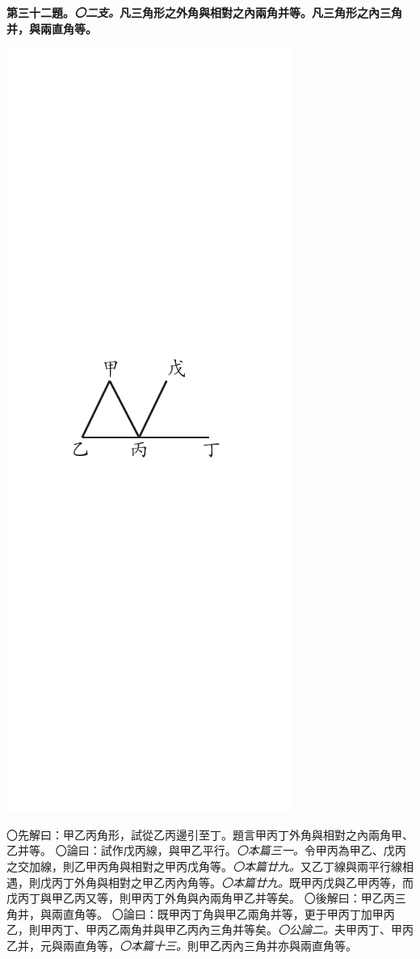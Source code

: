 \documentclass[12pt,b5paper,landscape]{article}
\newcommand{\ccom}[1]{{\footnotesize \emph{〇#1}}}
\newcommand{\bcom}[1]{〇#1}
\newcommand{\cthm}[1]{{
\vspace{8pt}

\bfseries #1}}
\begin{document}
\begin{multicols}{2}
\cthm{第三十二題。\ccom{二支。}凡三角形之外角與相對之內兩角并等。凡三角形之內三角并，與兩直角等。}
\begin{center}
      \includegraphics[angle=90]{eu81}
\end{center}
\bcom{先解曰：甲乙丙角形，試從乙丙邊引至丁。題言甲丙丁外角與相對之內兩角甲、乙并等。}
\bcom{論曰：試作戊丙線，與甲乙平行。\ccom{本篇三一。}令甲丙為甲乙、戊丙之交加線，則乙甲丙角與相對之甲丙戊角等。\ccom{本篇廿九。}又乙丁線與兩平行線相遇，則戊丙丁外角與相對之甲乙丙內角等。\ccom{本篇廿九。}既甲丙戊與乙甲丙等，而戊丙丁與甲乙丙又等，則甲丙丁外角與內兩角甲乙并等矣。}
\bcom{後解曰：甲乙丙三角并，與兩直角等。}
\bcom{論曰：既甲丙丁角與甲乙兩角并等，更于甲丙丁加甲丙乙，則甲丙丁、甲丙乙兩角并與甲乙丙內三角并等矣。\ccom{公論二。}夫甲丙丁、甲丙乙并，元與兩直角等，\ccom{本篇十三。}則甲乙丙內三角并亦與兩直角等。}


\end{multicols}
\end{document}
